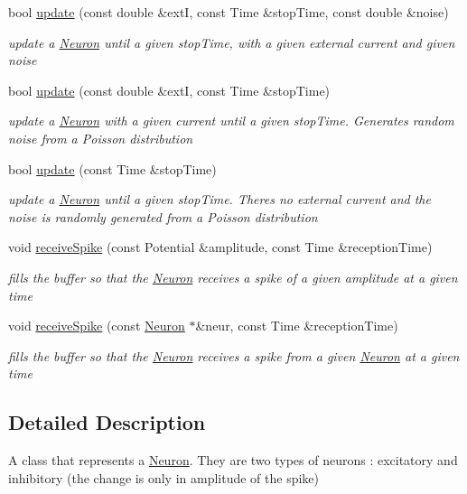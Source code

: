 \begin{DoxyCompactItemize}
bool \hyperlink{classNeuron_aa21dce996e08173d864c9f4b0198a793}{update} (const double \&extI, const Time \&stop\+Time, const double \&noise)
\begin{DoxyCompactList}\small\item\em update a \hyperlink{classNeuron}{Neuron} until a given stop\+Time, with a given external current and given noise \end{DoxyCompactList}\item 
bool \hyperlink{classNeuron_a9692066fbcd0d632246970c627784341}{update} (const double \&extI, const Time \&stop\+Time)
\begin{DoxyCompactList}\small\item\em update a \hyperlink{classNeuron}{Neuron} with a given current until a given stop\+Time. Generates random noise from a Poisson distribution \end{DoxyCompactList}\item 
bool \hyperlink{classNeuron_ae2e3e2ebf571a295c2858ee48efbecce}{update} (const Time \&stop\+Time)
\begin{DoxyCompactList}\small\item\em update a \hyperlink{classNeuron}{Neuron} until a given stop\+Time. There\textquotesingle{}s no external current and the noise is randomly generated from a Poisson distribution \end{DoxyCompactList}\item 
void \hyperlink{classNeuron_a8e54b7a86764bd1445f8a8105c3ba5e2}{receive\+Spike} (const Potential \&amplitude, const Time \&reception\+Time)
\begin{DoxyCompactList}\small\item\em fills the buffer so that the \hyperlink{classNeuron}{Neuron} receives a spike of a given amplitude at a given time \end{DoxyCompactList}\item 
void \hyperlink{classNeuron_aa2fb0abb3108ee6cec39773d3f7a0761}{receive\+Spike} (const \hyperlink{classNeuron}{Neuron} $\ast$\&neur, const Time \&reception\+Time)
\begin{DoxyCompactList}\small\item\em fills the buffer so that the \hyperlink{classNeuron}{Neuron} receives a spike from a given \hyperlink{classNeuron}{Neuron} at a given time \end{DoxyCompactList}\end{DoxyCompactItemize}


\subsection{Detailed Description}
A class that represents a \hyperlink{classNeuron}{Neuron}. They are two types of neurons \+: excitatory and inhibitory (the change is only in amplitude of the spike) 

